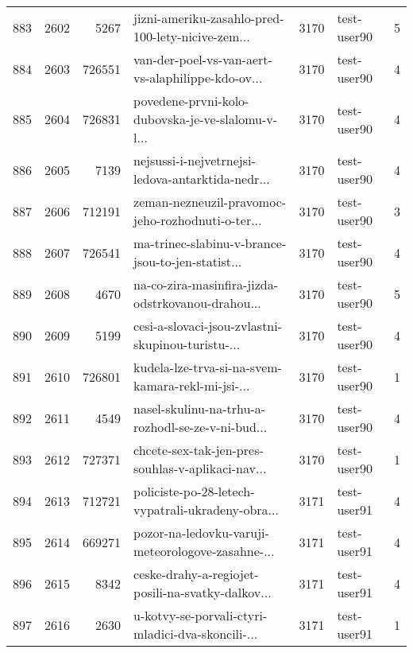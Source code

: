 \begin{tabular}{lrrlrlr}
883  &       2602 &     5267 &  jizni-ameriku-zasahlo-pred-100-lety-nicive-zem... &     3170 &                  test-user90 &               5 \\
884  &       2603 &   726551 &  van-der-poel-vs-van-aert-vs-alaphilippe-kdo-ov... &     3170 &                  test-user90 &               4 \\
885  &       2604 &   726831 &  povedene-prvni-kolo-dubovska-je-ve-slalomu-v-l... &     3170 &                  test-user90 &               4 \\
886  &       2605 &     7139 &  nejsussi-i-nejvetrnejsi-ledova-antarktida-nedr... &     3170 &                  test-user90 &               4 \\
887  &       2606 &   712191 &  zeman-nezneuzil-pravomoc-jeho-rozhodnuti-o-ter... &     3170 &                  test-user90 &               3 \\
888  &       2607 &   726541 &  ma-trinec-slabinu-v-brance-jsou-to-jen-statist... &     3170 &                  test-user90 &               4 \\
889  &       2608 &     4670 &  na-co-zira-masinfira-jizda-odstrkovanou-drahou... &     3170 &                  test-user90 &               5 \\
890  &       2609 &     5199 &  cesi-a-slovaci-jsou-zvlastni-skupinou-turistu-... &     3170 &                  test-user90 &               4 \\
891  &       2610 &   726801 &  kudela-lze-trva-si-na-svem-kamara-rekl-mi-jsi-... &     3170 &                  test-user90 &               1 \\
892  &       2611 &     4549 &  nasel-skulinu-na-trhu-a-rozhodl-se-ze-v-ni-bud... &     3170 &                  test-user90 &               4 \\
893  &       2612 &   727371 &  chcete-sex-tak-jen-pres-souhlas-v-aplikaci-nav... &     3170 &                  test-user90 &               1 \\
894  &       2613 &   712721 &  policiste-po-28-letech-vypatrali-ukradeny-obra... &     3171 &                  test-user91 &               4 \\
895  &       2614 &   669271 &  pozor-na-ledovku-varuji-meteorologove-zasahne-... &     3171 &                  test-user91 &               4 \\
896  &       2615 &     8342 &  ceske-drahy-a-regiojet-posili-na-svatky-dalkov... &     3171 &                  test-user91 &               4 \\
897  &       2616 &     2630 &  u-kotvy-se-porvali-ctyri-mladici-dva-skoncili-... &     3171 &                  test-user91 &               1 \\

\end{tabular}
